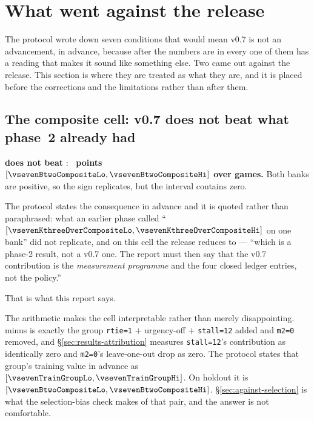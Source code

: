 \section{What went against the release}
\label{sec:against}

The protocol wrote down seven conditions that would mean v0.7 is not an advancement, in advance,
because after the numbers are in every one of them has a reading that makes it sound like something
else. Two came out against the release. This section is where they are treated as what they are, and
it is placed before the corrections and the limitations rather than after them.

\subsection{The composite cell: v0.7 does not beat what phase~2 already had}
\label{sec:against-composite}

\frozen{} \textbf{does not beat} \composite{}: \textbf{\vsevenBtwoComposite{}~points
$[\vsevenBtwoCompositeLo, \vsevenBtwoCompositeHi]$ over \vsevenBtwoCompositeN{} games.} Both banks are
positive, so the sign replicates, but the interval contains zero.

The protocol states the consequence in advance and it is quoted rather than paraphrased: what an
earlier phase called ``\vsevenKthreeOverComposite{}
$[\vsevenKthreeOverCompositeLo, \vsevenKthreeOverCompositeHi]$ on one bank'' did not replicate, and on
this cell the release reduces to \composite{} --- ``which is a phase-2 result, not a v0.7 one. The
report must then say that the v0.7 contribution is the \emph{measurement programme} and the four
closed ledger entries, not the policy.''

That is what this report says.

The arithmetic makes the cell interpretable rather than merely disappointing. \frozen{} minus
\composite{} is exactly the group \texttt{rtie=1} $+$ urgency-off $+$ \texttt{stall=12} added and
\texttt{m2=0} removed, and \S\ref{sec:results-attribution} measures \texttt{stall=12}'s contribution
as identically zero and \texttt{m2=0}'s leave-one-out drop as zero. The protocol states that group's
training value in advance as \vsevenTrainGroup{}
$[\vsevenTrainGroupLo, \vsevenTrainGroupHi]$. On holdout it is \vsevenBtwoComposite{}
$[\vsevenBtwoCompositeLo, \vsevenBtwoCompositeHi]$. \S\ref{sec:against-selection} is what the
selection-bias check makes of that pair, and the answer is not comfortable.

